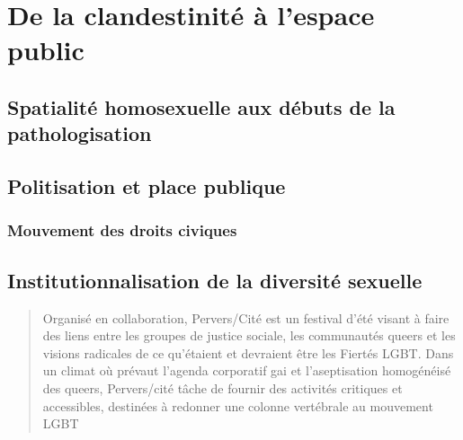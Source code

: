 
\chapter{De la clandestinité à l'espace public}
\label{cha:de_la_clandestinite_a_l_espace_public}

\section{Spatialité homosexuelle aux débuts de la pathologisation}
\label{sec:spatialit_homosexuelle_aux_d_buts_de_la_pathologisation}

\section{Politisation et place publique}
\label{sec:politisation_et_place_publique}



\subsection{Mouvement des droits civiques}
\label{sub:mouvement_des_droits_civiques}

\section{Institutionnalisation de la diversité sexuelle}
\label{sec:institutionnalisation_de_la_diversit_sexuelle}


\blockquote[{\cite{Pervers/Cite2015}}][.]{Organisé en collaboration,
  Pervers/Cité est un festival d’été visant à faire des liens entre les groupes
  de justice sociale, les communautés queers et les visions radicales de ce
  qu'étaient et devraient être les Fiertés LGBT\@. Dans un climat où prévaut
  l’agenda corporatif gai et l’aseptisation homogénéisé des queers, Pervers/cité
  tâche de fournir des activités critiques et accessibles, destinées à redonner
  une colonne vertébrale au mouvement LGBT}

